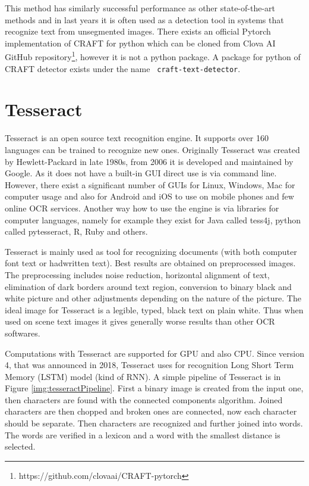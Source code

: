 This method has similarly successful performance as other state-of-the-art methods and in last years it is often used as a detection tool in systems that recognize text from unsegmented images. There exists an official Pytorch implementation of CRAFT for python which can be cloned from Clova AI GitHub repository\footnote{https://github.com/clovaai/CRAFT-pytorch}, however it is not a python package. A package for python of CRAFT detector exists under the name \texttt{
craft-text-detector}.

\section{Tesseract}

Tesseract is an open source text recognition engine. It supports over 160 languages can be trained to recognize new ones. Originally Tesseract was created by Hewlett-Packard in late 1980s, from 2006 it is developed and maintained by Google. As it does not have a built-in GUI direct use is via command line. However, there exist a significant number of GUIs for Linux, Windows, Mac for computer usage and also for Android and iOS to use on mobile phones and few online OCR services. Another way how to use the engine is via libraries for computer languages, namely for example they exist for Java called tess4j, python called pytesseract, R, Ruby and others. \cite{tesseract1}

Tesseract is mainly used as tool for recognizing documents (with both computer font text or hadwritten text). Best results are obtained on preprocessed images. The preprocessing includes noise reduction, horizontal alignment of text, elimination of dark borders around text region, conversion to binary black and white picture and other adjustments depending on the nature of the picture. The ideal image for Tesseract is a legible, typed, black text on plain white. Thus when used on scene text images it gives generally worse results than other OCR softwares. 

Computations with Tesseract are supported for GPU and also CPU. Since version 4, that was announced in 2018, Tesseract uses for recognition Long Short Term Memory (LSTM) model (kind of RNN). A simple pipeline of Tesseract is in Figure \ref*{img:tesseractPipeline}. First a binary image is created from the input one, then characters are found with the connected components algorithm. Joined characters are then chopped and broken ones are connected, now each character should be separate. Then characters are recognized and further joined into words. The words are verified in a lexicon and a word with the smallest distance is selected.\cite{tesseract2}

